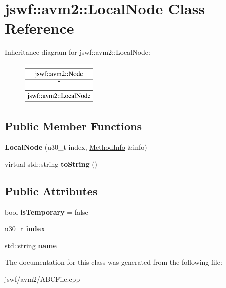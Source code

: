 \hypertarget{classjswf_1_1avm2_1_1_local_node}{\section{jswf\+:\+:avm2\+:\+:Local\+Node Class Reference}
\label{classjswf_1_1avm2_1_1_local_node}
}
Inheritance diagram for jswf\+:\+:avm2\+:\+:Local\+Node\+:\begin{figure}[H]
\begin{center}
\leavevmode
\includegraphics[height=2.000000cm]{classjswf_1_1avm2_1_1_local_node}
\end{center}
\end{figure}
\subsection*{Public Member Functions}
\begin{DoxyCompactItemize}
\item 
\hypertarget{classjswf_1_1avm2_1_1_local_node_afe7df698d7f9e53e68dd24d65e45225f}{{\bfseries Local\+Node} (u30\+\_\+t index, \hyperlink{structjswf_1_1avm2_1_1_method_info}{Method\+Info} \&info)}\label{classjswf_1_1avm2_1_1_local_node_afe7df698d7f9e53e68dd24d65e45225f}

\item 
\hypertarget{classjswf_1_1avm2_1_1_local_node_a82143e820463b4f11653d3cf050974a3}{virtual std\+::string {\bfseries to\+String} ()}\label{classjswf_1_1avm2_1_1_local_node_a82143e820463b4f11653d3cf050974a3}

\end{DoxyCompactItemize}
\subsection*{Public Attributes}
\begin{DoxyCompactItemize}
\item 
\hypertarget{classjswf_1_1avm2_1_1_local_node_ad80457f19eca2a744569d052a0a7b6cd}{bool {\bfseries is\+Temporary} = false}\label{classjswf_1_1avm2_1_1_local_node_ad80457f19eca2a744569d052a0a7b6cd}

\item 
\hypertarget{classjswf_1_1avm2_1_1_local_node_a094f4d7cfa7e3007cbb1a324e2456cbe}{u30\+\_\+t {\bfseries index}}\label{classjswf_1_1avm2_1_1_local_node_a094f4d7cfa7e3007cbb1a324e2456cbe}

\item 
\hypertarget{classjswf_1_1avm2_1_1_local_node_ac38de9b0bccf793ae4b4d7d5a2c0189f}{std\+::string {\bfseries name}}\label{classjswf_1_1avm2_1_1_local_node_ac38de9b0bccf793ae4b4d7d5a2c0189f}

\end{DoxyCompactItemize}


The documentation for this class was generated from the following file\+:\begin{DoxyCompactItemize}
\item 
jswf/avm2/A\+B\+C\+File.\+cpp\end{DoxyCompactItemize}
